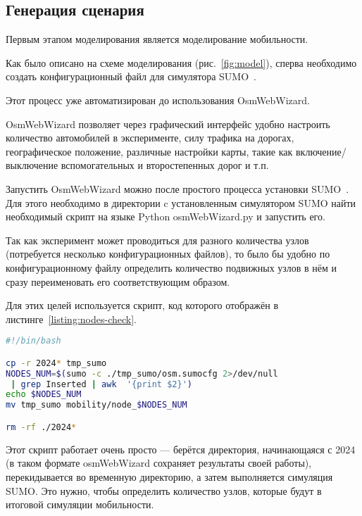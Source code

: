 \subsection{Генерация сценария}

Первым этапом моделирования является моделирование мобильности.

Как было описано на схеме моделирования (рис.~\ref{fig:model}), сперва необходимо создать конфигурационный файл для симулятора SUMO~\cite{seema2022simulation}.

Этот процесс уже автоматизирован до использования OsmWebWizard. 

OsmWebWizard позволяет через графический интерфейс удобно настроить количество автомобилей в эксперименте, силу трафика на дорогах, географическое положение, различные настройки карты, такие как включение/выключение вспомогательных и второстепенных дорог и т.п.

Запустить OsmWebWizard можно после простого процесса установки SUMO~\cite{sumo_docs}. Для этого необходимо в директории c установленным симулятором SUMO найти необходимый скрипт на языке Python osmWebWizard.py и запустить его.

Так как эксперимент может проводиться для разного количества узлов (потребуется несколько конфигурационных файлов), то было бы удобно по конфигурационному файлу определить количество подвижных узлов в нём и сразу переименовать его соответствующим образом.

Для этих целей используется скрипт, код которого отображён в листинге~\ref{listing:nodes-check}.

\begin{lstlisting}[language=bash, style=mystyle, caption=Скрипт для разметки конфиг-файлов по количеству узлов, label=listing:nodes-check]
#!/bin/bash

cp -r 2024* tmp_sumo
NODES_NUM=$(sumo -c ./tmp_sumo/osm.sumocfg 2>/dev/null
 | grep Inserted | awk  '{print $2}')
echo $NODES_NUM
mv tmp_sumo mobility/node_$NODES_NUM

rm -rf ./2024*

\end{lstlisting}

Этот скрипт работает очень просто --- берётся директория, начинающаяся с 2024 (в таком формате osmWebWizard сохраняет результаты своей работы), перекидывается во временную директорию, а затем выполняется симуляция SUMO. Это нужно, чтобы определить количество узлов, которые будут в итоговой симуляции мобильности. 

